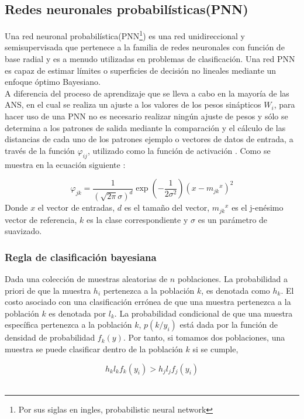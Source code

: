 \documentclass[11pt,titlepage]{report}
\begin{document}
\subsection{Redes neuronales probabilísticas(PNN)}

Una red neuronal probabilística(PNN\footnote{Por sus siglas en ingles, probabilistic neural network}) es una red unidireccional y semisupervisada que pertenece a la familia de redes neuronales con función de base radial y es a menudo utilizadas en problemas de clasificación. Una red PNN es capaz de estimar límites o superficies de decisión no lineales mediante un enfoque óptimo Bayesiano.\\

A diferencia del proceso de aprendizaje que se lleva a cabo en la mayoría de las ANS, en el cual se realiza un ajuste a los valores de los pesos sinápticos $W_i$, para hacer uso de una PNN no es necesario realizar ningún ajuste de pesos y sólo se determina a los patrones de salida mediante la comparación y el cálculo de las distancias de cada uno de los patrones ejemplo o vectores de datos de entrada, a través de la función $\varphi_{ij}$, utilizado como la función de activación \cite{Art15}. Como se muestra en la ecuación siguiente \cite{Art16}:

\[ \varphi_{jk} = \dfrac{1}{(\sqrt{2\pi}\sigma)^d} \exp{(-\dfrac{1}{2\sigma^2})(x-{m_{jk}}^x)^2} \]
\label{10}
Donde $x$ el vector de entradas, $d$ es el tamaño del vector, ${m_{jk}}^x$ es el j-enésimo vector de referencia, $k$ es la clase correspondiente y $\sigma$ es un parámetro de suavizado.   

\subsubsection{Regla de clasificación bayesiana}
\label{06}
Dada una colección de muestras aleatorias de $n$ poblaciones. La probabilidad a priori de que la muestra $h_i$ pertenezca a la población $k$, es denotada como $h_k$. El costo asociado con una clasificación errónea de que una muestra pertenezca a la población $k$ es denotada por $l_k$. La probabilidad condicional de que una muestra específica pertenezca a la población $k$, $p(k/y_i)$ está dada por la función de densidad de probabilidad $f_{k}(y)$. Por tanto, si tomamos dos poblaciones, una muestra se puede clasificar dentro de la población $k$ si se cumple,

\[ h_k l_k f_{k}(y_i) > h_j l_j f_{j}(y_i) \]\\ 
\end{document}
